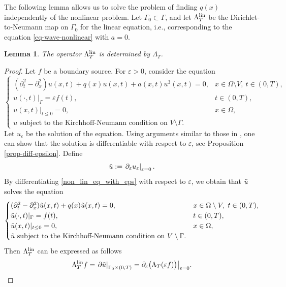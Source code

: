 \documentclass[11pt]{amsart}
\theoremstyle{definition}
\theoremstyle{plain}
\newtheorem{lemma}[definition]{Lemma}
\numberwithin{equation}{section}
\begin{document}
\smallskip
The following lemma allows us to solve the problem of finding $q(x)$ independently of the nonlinear problem. 
Let $\Gamma_0\subset \Gamma$, and let $\Lambda_T^{\rm lin}$ be the Dirichlet-to-Neumann map on $\Gamma_0$ for the linear equation, i.e., corresponding to the equation \eqref{eq-wave-nonlinear} with $a=0$.
\begin{lemma}
    The operator $\Lambda_T^{\rm lin}$ is determined by $\Lambda_T$.
\end{lemma}
\begin{proof}
    Let $f$ be a boundary source. For $\varepsilon>0$, consider the equation
    \begin{equation}\label{non_lin_eq_with_eps}
    \begin{cases}
    (\partial_{t}^2 -\partial_x^2 ) u(x,t)+q(x) u(x,t)+a(x,t)u^3(x,t)=0, &x\in \Omega\setminus V, \ t \in (0,T),\\
    u(\cdot,t)|_{\Gamma}=\varepsilon f(t), & t\in (0,T),\\
    u(x,t)|_{t \leq 0}=0, & x\in \Omega, \\
          u \textrm{ subject to the Kirchhoff-Neumann condition on } V\setminus\Gamma.
    \end{cases}
\end{equation}
Let $u_\varepsilon$ be the solution of the equation. 
Using arguments similar to those in \cite[Proposition 2]{LassasLiimatainenPotenciano-MachadoTyni}, one can show that the solution is differentiable with respect to $\varepsilon$, see Proposition \ref{prop-diff-epsilon}. Define 
\begin{equation}    \Tilde{u}:=\left.\partial_\varepsilon u_\varepsilon \right|_{\varepsilon = 0}.
\end{equation}
By differentiating \eqref{non_lin_eq_with_eps} with respect to $\varepsilon$, we obtain that $\Tilde{u}$ solves the equation
\begin{equation}\label{non_lin_eq_with_eps1}
    \begin{cases}
    (\partial_{t}^2 -\partial_x^2 ) \Tilde{u}(x,t)+q(x) \Tilde{u}(x,t)=0, &x\in \Omega\setminus V, \ t \in (0,T),\\
    \Tilde{u}(\cdot,t)|_{\Gamma}= f(t), & t\in (0,T),\\
    \Tilde{u}(x,t)|_{t \leq 0}=0, & x\in \Omega,\\
          \Tilde{u} \textrm{ subject to the Kirchhoff-Neumann condition on } V\setminus\Gamma.
    \end{cases}
\end{equation}
Then $\Lambda_T^{\rm lin}$ can be expressed as follows
\begin{equation*}
    \Lambda_T^{\rm lin} f = \left.\partial \Tilde{u} \right|_{\Gamma_0\times (0,T)} = \partial_\varepsilon \big( \Lambda_T(\varepsilon f)\big) \big|_{\varepsilon = 0}. \qedhere
\end{equation*}
\end{proof}
\end{document}
